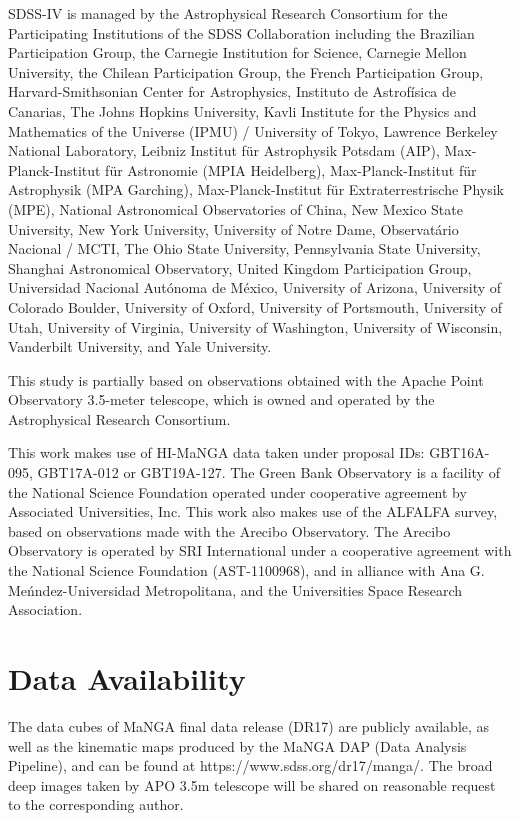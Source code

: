 \documentclass[fleqn,usenatbib]{mnras}
\begin{document}
SDSS-IV is managed by the Astrophysical Research Consortium for the Participating Institutions of the SDSS Collaboration including the Brazilian Participation Group, the Carnegie Institution for Science, Carnegie Mellon University, the Chilean Participation Group, the French Participation Group, Harvard-Smithsonian Center for Astrophysics, Instituto de Astrof\'isica de Canarias, The Johns Hopkins University, Kavli Institute for the Physics and Mathematics of the Universe (IPMU) / University of Tokyo, Lawrence Berkeley National Laboratory, Leibniz Institut f\"ur Astrophysik Potsdam (AIP), Max-Planck-Institut f\"ur Astronomie (MPIA Heidelberg), Max-Planck-Institut f\"ur Astrophysik (MPA Garching), Max-Planck-Institut f\"ur Extraterrestrische Physik (MPE), National Astronomical Observatories of China, New Mexico State University, New York University, University of Notre Dame, Observat\'ario Nacional / MCTI, The Ohio State University, Pennsylvania State University, Shanghai Astronomical Observatory, United Kingdom Participation Group, Universidad Nacional Aut\'onoma de M\'exico, University of Arizona, University of Colorado Boulder, University of Oxford, University of Portsmouth, University of Utah, University of Virginia, University of Washington, University of Wisconsin, Vanderbilt University, and Yale University.

This study is partially based on observations obtained with
the Apache Point Observatory 3.5-meter telescope, which is
owned and operated by the Astrophysical Research Consortium. 

This work makes use of HI-MaNGA data taken under proposal IDs: GBT16A-095, GBT17A-012 or GBT19A-127. The Green Bank Observatory is a facility of the National Science Foundation operated under cooperative agreement by Associated Universities, Inc. 
This work also makes use of the ALFALFA survey, based on observations made with the Arecibo Observatory. The Arecibo Observatory is operated by SRI International under a cooperative agreement with the National Science Foundation (AST-1100968), and in alliance with Ana G. Me\'nndez-Universidad Metropolitana, and the Universities Space Research Association. 



\section*{Data Availability}

The data cubes of MaNGA final data release (DR17) are publicly available, 
as well as the kinematic maps produced by the MaNGA DAP (Data Analysis Pipeline), 
and can be found at https://www.sdss.org/dr17/manga/. 
The broad deep images taken by APO 3.5m telescope will be shared 
on reasonable request to the corresponding author.
\end{document}
